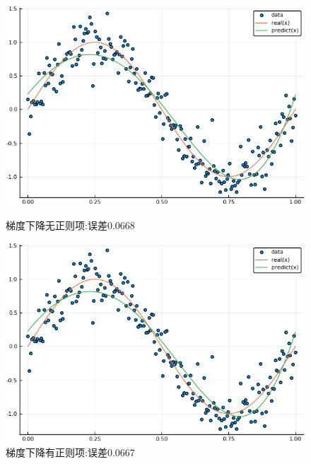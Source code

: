 \documentclass{ML}
\begin{document}
\begin{figure}[H]
	\begin{minipage}[c]{0.5\linewidth}
		\centering
		\includegraphics[width=0.9\linewidth]{media/200/SGDNoLambda}
		\caption{梯度下降无正则项:误差0.0668} %
		\label{fig:sgdnolambda200}
	\end{minipage}
	\begin{minipage}[c]{0.5\linewidth}
		\centering
		\includegraphics[width=0.9\linewidth]{media/200/SGDWithLambda}
		\caption{梯度下降有正则项:误差0.0667} %
		\label{fig:sgdwithlambda200}
	\end{minipage}
\end{figure}
\end{document}
